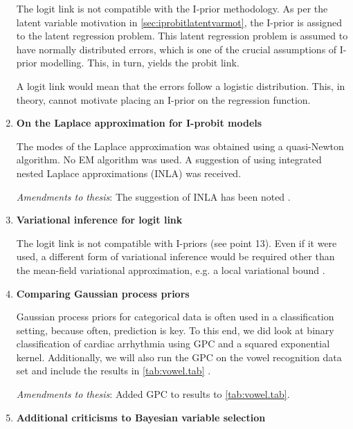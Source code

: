 \documentclass[11pt,openright,twoside]{report}
\begin{document}
\begin{enumerate}
  The logit link is not compatible with the I-prior methodology.
  As per the latent variable motivation in \cref{sec:iprobitlatentvarmot}, the I-prior is assigned to the latent regression problem.
  This latent regression problem is assumed to have normally distributed errors, which is one of the crucial assumptions of I-prior modelling.
  This, in turn, yields the probit link.
  
  A logit link would mean that the errors follow a logistic distribution.
  This, in theory, cannot motivate placing an I-prior on the regression function.
  

  \item \textbf{On the Laplace approximation for I-probit models}
  
  The modes of the Laplace approximation was obtained using a quasi-Newton algorithm.
  No EM algorithm was used. 
  A suggestion of using integrated nested Laplace approximations (INLA) was received.
  
  \textit{Amendments to thesis}: The suggestion of INLA has been noted .

  \item \textbf{Variational inference for logit link}

  The logit link is not compatible with I-priors (see point 13). 
  Even if it were used, a different form of variational inference would be required other than the mean-field variational approximation, e.g. a local variational bound \citep{bishop2006pattern}.
  
  \item \textbf{Comparing Gaussian process priors}

  Gaussian process priors for categorical data is often used in a classification setting, because often, prediction is key.
  To this end, we did look at binary classification of cardiac arrhythmia using GPC and a squared exponential kernel.
  Additionally, we will also run the GPC on the vowel recognition data set and include the results in \cref{tab:vowel.tab} .
  
  \textit{Amendments to thesis}: Added GPC to results to \cref{tab:vowel.tab}.
  
  \item \textbf{Additional criticisms to Bayesian variable selection}
  

\end{enumerate}
\end{document}
